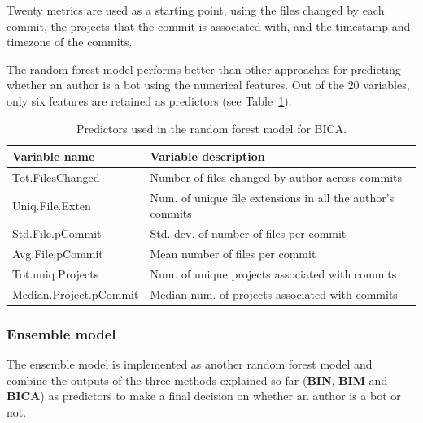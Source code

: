 \documentclass[a4paper, 12pt]{book}
\begin{document}
Twenty metrics are used as a starting point, using the files changed by each commit, the projects that the commit is associated with, and the timestamp and timezone of the commits.

The random forest model performs better than other approaches for predicting whether an author is a bot using the numerical features. Out of the $20$ variables, only six features are retained as predictors (see Table~\ref{table:dey-table-predictors}).

\begin{table}[htb]
\renewcommand{\arraystretch}{1.2}
 \begin{center}
  \begin{tabular}{   p{5cm}   %
    >{\raggedright\arraybackslash} p{10cm} }  
    \toprule
    \textbf{Variable name} & \textbf{Variable description}\\ 
    \midrule
    Tot.FilesChanged & Number of files changed by author across commits  \\ %
    Uniq.File.Exten & Num. of unique file extensions in all the author's commits \\ %
    Std.File.pCommit & Std. dev. of number of files per commit \\ %
    Avg.File.pCommit & Mean number of files per commit \\ %
    Tot.uniq.Projects & Num. of unique projects associated with commits\\ %
    Median.Project.pCommit & Median num. of projects associated with commits\\
    \bottomrule
  \end{tabular}
  \caption{Predictors used in the random forest model for BICA.}
  \label{table:dey-table-predictors}
 \end{center}
\end{table}


\subsubsection{Ensemble model}
\label{sssec:dey-ensemble}

The ensemble model is implemented as another random forest model and combine the outputs of the three methods explained so far (\textbf{BIN}, \textbf{BIM} and \textbf{BICA}) as predictors to make a final decision on whether an author is a bot or not.
\end{document}
